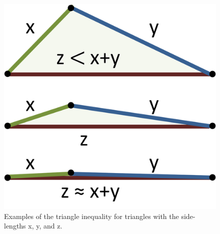 \documentclass{article}
\begin{document}
\begin{enumerate}
    \begin{figure}[ht]
     \centering
     \includegraphics[scale=0.3]{docs/pictures/TriangleInequality.png}
     \caption{Examples of the triangle inequality for triangles with the side-lengths x, y, and z. \cite{wiki:Triangle}}
     \label{Figure:TriangleInequality}
    \end{figure}
    
\end{enumerate}
\end{document}
